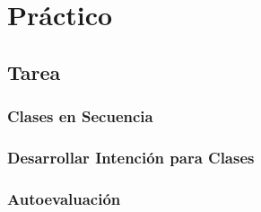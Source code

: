 \chapter{Práctico}
\section{Tarea}
\subsection{Clases en Secuencia}
\subsection{Desarrollar Intención para Clases}
\subsection{Autoevaluación}


